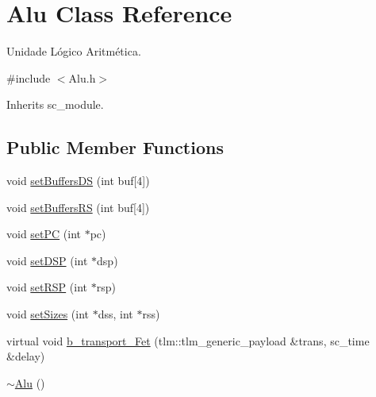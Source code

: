 \hypertarget{classAlu}{\section{Alu Class Reference}
\label{classAlu}
}


Unidade Lógico Aritmética.  




{\ttfamily \#include $<$Alu.\+h$>$}



Inherits sc\+\_\+module.

\subsection*{Public Member Functions}
\begin{DoxyCompactItemize}
\item 
void \hyperlink{classAlu_a7a60dcc8e76a08c1cd20597f84cbd321}{set\+Buffers\+D\+S} (int buf\mbox{[}4\mbox{]})
\item 
void \hyperlink{classAlu_ab413ef21248de9a39c543d0fd1c233cb}{set\+Buffers\+R\+S} (int buf\mbox{[}4\mbox{]})
\item 
void \hyperlink{classAlu_ab3a692120ec7c7a1b7625b8f601272a6}{set\+P\+C} (int $\ast$pc)
\item 
void \hyperlink{classAlu_a68e91decd645362078515555cde833e7}{set\+D\+S\+P} (int $\ast$dsp)
\item 
void \hyperlink{classAlu_aa507af8006a2862c7b17a3d637ce38de}{set\+R\+S\+P} (int $\ast$rsp)
\item 
void \hyperlink{classAlu_af34256a02a7be19a7d60a910db157210}{set\+Sizes} (int $\ast$dss, int $\ast$rss)
\item 
virtual void \hyperlink{classAlu_ad8e186aac3201dc8a26cc61d7a90c5d2}{b\+\_\+transport\+\_\+\+Fet} (tlm\+::tlm\+\_\+generic\+\_\+payload \&trans, sc\+\_\+time \&delay)
\item 
\hyperlink{classAlu_aab26dc9ed3cb4bdd1d13206f19a00552}{$\sim$\+Alu} ()
\end{DoxyCompactItemize}
